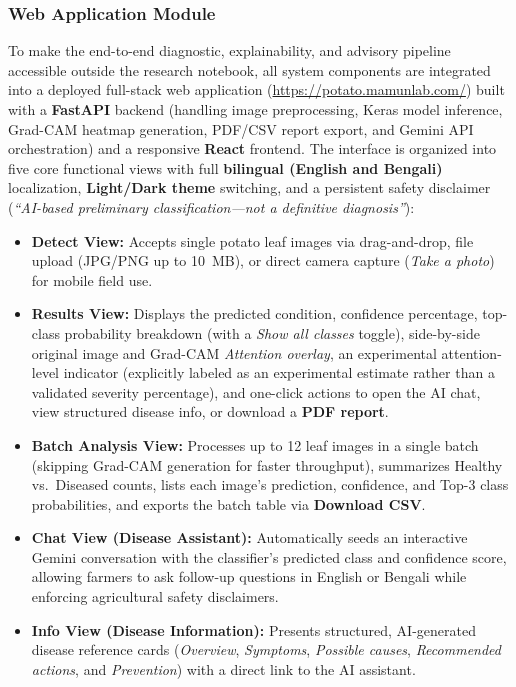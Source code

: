 \subsubsection{Web Application Module}
To make the end-to-end diagnostic, explainability, and advisory pipeline accessible outside the research notebook, all system components are integrated into a deployed full-stack web application (\url{https://potato.mamunlab.com/}) built with a \textbf{FastAPI} backend (handling image preprocessing, Keras model inference, Grad-CAM heatmap generation, PDF/CSV report export, and Gemini API orchestration) and a responsive \textbf{React} frontend. The interface is organized into five core functional views with full \textbf{bilingual (English and Bengali)} localization, \textbf{Light/Dark theme} switching, and a persistent safety disclaimer (\textit{``AI-based preliminary classification---not a definitive diagnosis''}):
\begin{itemize}
    \item \textbf{Detect View:} Accepts single potato leaf images via drag-and-drop, file upload (JPG/PNG up to 10~MB), or direct camera capture (\textit{Take a photo}) for mobile field use.
    \item \textbf{Results View:} Displays the predicted condition, confidence percentage, top-class probability breakdown (with a \textit{Show all classes} toggle), side-by-side original image and Grad-CAM \textit{Attention overlay}, an experimental attention-level indicator (explicitly labeled as an experimental estimate rather than a validated severity percentage), and one-click actions to open the AI chat, view structured disease info, or download a \textbf{PDF report}.
    \item \textbf{Batch Analysis View:} Processes up to 12 leaf images in a single batch (skipping Grad-CAM generation for faster throughput), summarizes Healthy vs.\ Diseased counts, lists each image's prediction, confidence, and Top-3 class probabilities, and exports the batch table via \textbf{Download CSV}.
    \item \textbf{Chat View (Disease Assistant):} Automatically seeds an interactive Gemini conversation with the classifier's predicted class and confidence score, allowing farmers to ask follow-up questions in English or Bengali while enforcing agricultural safety disclaimers.
    \item \textbf{Info View (Disease Information):} Presents structured, AI-generated disease reference cards (\textit{Overview}, \textit{Symptoms}, \textit{Possible causes}, \textit{Recommended actions}, and \textit{Prevention}) with a direct link to the AI assistant.
\end{itemize}

